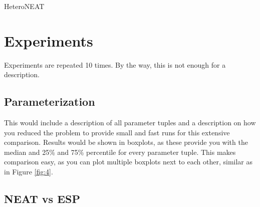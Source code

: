 \documentclass{hbrs-ecta-report}
\begin{document}
\begin{algorithm}[ht!]
\caption{HeteroNEAT}
\label{alg:heteroneat}
\begin{algorithmic}[1]
\State  $c$: $\leftarrow$ mutRate, crossRate, numSpecies, actFcns /* Configuration */
\Statex Input: evalFcn
\State $P$: $\leftarrow$ \textbf{\textit{initPop($n$)}} minimal networks
	\State $N$: $\leftarrow$ expressNetwork($P$)
	\State $F$: $\leftarrow$ evalFcn($N$)
	\State $P$: $\leftarrow$ $(P,N,F)$	/* Assign fitness /*
	\State $S$: $\leftarrow$ speciate($P$,$c$)
	\For{species $s$ in $S$)
		\State $s'(1)$ $\leftarrow$ getElite($s$)
		\State cull($s$,$c$) /* If species is large enough */
		\State $p$: $\leftarrow$ tournamentSelect($s$)
		\State crossover($p$,$c$) /* Combine matching connections */
		\State \textbf{\textit{mutate($p$,$c$)}}
	\EndFor
\EndFor
\EndFunction
\end{algorithmic}
\end{algorithm}

\FloatBarrier
\section{Experiments}
Experiments are repeated 10 times. By the way, this is not enough for a description.

\subsection{Parameterization}
This would include a description of all parameter tuples and a description on how you reduced the problem to provide small and fast runs for this extensive comparison. Results would be shown in boxplots, as these provide you with the median and 25\% and 75\% percentile for every parameter tuple. This makes comparison easy, as you can plot multiple boxplots next to each other, similar as in Figure \ref{fig:4}.

\subsection{NEAT vs ESP}
\end{document}
